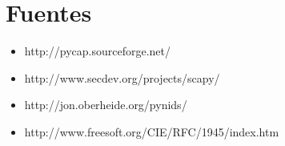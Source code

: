 \section{Fuentes}

\begin{itemize}
\item http://pycap.sourceforge.net/
\item http://www.secdev.org/projects/scapy/
\item http://jon.oberheide.org/pynids/
\item http://www.freesoft.org/CIE/RFC/1945/index.htm
\end{itemize}
